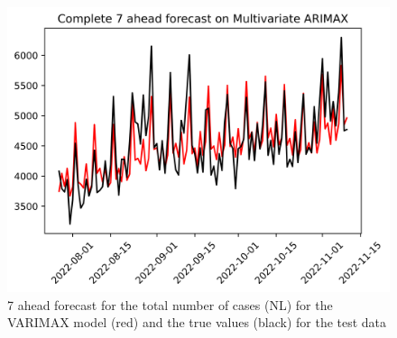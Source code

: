 \begin{figure}
\begin{minipage}{.32\textwidth}
  \label{fig:tot_cases_fc_7_ARIMAX_DE}
\end{minipage}
\begin{minipage}{.32\textwidth}
  \centering
  \includegraphics[width=\linewidth]{pics/7_ah/Complete_7_ahead_Multivariate ARIMAX.png}
  \caption{7 ahead forecast for the total number of cases (NL) for the VARIMAX model (red) and the true values (black) for the test data}
  \label{fig:tot_cases_fc_7_VARIMAX}
\end{minipage}

\end{figure}
